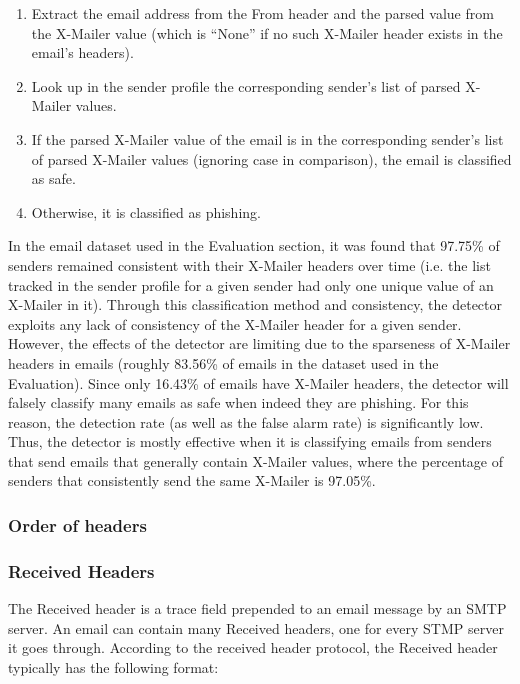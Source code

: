 \documentclass[letterpaper]{article}
\newcommand\tab[1][1cm]{\hspace*{#1}}
\begin{document}
\begin{enumerate}
\item Extract the email address from the From header and the parsed value from the X-Mailer value (which is ``None'' if no such X-Mailer header exists in the email's headers).
\item Look up in the sender profile the corresponding sender's list of parsed X-Mailer values.
\item If the parsed X-Mailer value of the email is in the corresponding sender's list of parsed X-Mailer values (ignoring case in comparison), the email is classified as safe.
\item Otherwise, it is classified as phishing.
\end{enumerate}

\tab In the email dataset used in the Evaluation section, it was found that 97.75\% of senders remained consistent with their X-Mailer headers over time (i.e. the list tracked in the sender profile for a given sender had only one unique value of an X-Mailer in it).  Through this classification method and consistency, the detector exploits any lack of consistency of the X-Mailer header for a given sender.  However, the effects of the detector are limiting due to the sparseness of X-Mailer headers in emails (roughly 83.56\% of emails in the dataset used in the Evaluation). Since only 16.43\% of emails have X-Mailer headers, the detector will falsely classify many emails as safe when indeed they are phishing. For this reason, the detection rate (as well as the false alarm rate) is significantly low. Thus, the detector is mostly effective when it is classifying emails from senders that send emails that generally contain X-Mailer values, where the percentage of senders that consistently send the same X-Mailer is 97.05\%.

\subsubsection{Order of headers}

\subsubsection{Received Headers}
The Received header is a trace field prepended to an email message by an SMTP server. An email can contain many Received headers, one for every STMP server it goes through. According to the received header protocol, the Received header typically has the following format:\\
\end{document}
